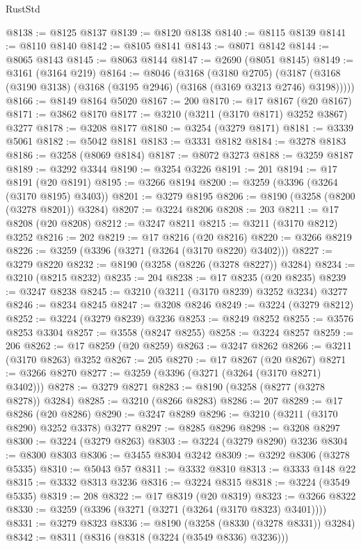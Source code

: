 \begin{lexlean}{RustStd}
\begin{coremodule}
@8138 := @8125 @8137
@8139 := @8120 @8138
@8140 := @8115 @8139
@8141 := @8110 @8140
@8142 := @8105 @8141
@8143 := @8071 @8142
@8144 := @8065 @8143
@8145 := @8063 @8144
@8147 := @2690 (@8051 @8145)
@8149 := @3161 (@3164 @219)
@8164 := @8046
    (@3168
      (@3180 @2705)
      (@3187 (@3168 (@3190 @3138) (@3168 (@3195 @2946) (@3168 (@3169 @3213 @2746) @3198)))))
@8166 := @8149 @8164 @5020
@8167 := 200
@8170 := @17 @8167 (@20 @8167)
@8171 := @3862 @8170
@8177 := @3210 (@3211 (@3170 @8171) @3252 @3867) @3277
@8178 := @3208 @8177
@8180 := @3254 (@3279 @8171)
@8181 := @3339 @5061
@8182 := @5042 @8181
@8183 := @3331 @8182
@8184 := @3278 @8183
@8186 := @3258 (@8069 @8184)
@8187 := @8072 @3273
@8188 := @3259 @8187
@8189 := @3292 @3344
@8190 := @3254 @3226
@8191 := 201
@8194 := @17 @8191 (@20 @8191)
@8195 := @3266 @8194
@8200 := @3259 (@3396 (@3264 (@3170 @8195) @3403))
@8201 := @3279 @8195
@8206 := @8190 (@3258 (@8200 (@3278 @8201)) @3284)
@8207 := @3224 @8206
@8208 := 203
@8211 := @17 @8208 (@20 @8208)
@8212 := @3247 @8211
@8215 := @3211 (@3170 @8212) @3252
@8216 := 202
@8219 := @17 @8216 (@20 @8216)
@8220 := @3266 @8219
@8226 := @3259 (@3396 (@3271 (@3264 (@3170 @8220) @3402)))
@8227 := @3279 @8220
@8232 := @8190 (@3258 (@8226 (@3278 @8227)) @3284)
@8234 := @3210 (@8215 @8232)
@8235 := 204
@8238 := @17 @8235 (@20 @8235)
@8239 := @3247 @8238
@8245 := @3210 (@3211 (@3170 @8239) @3252 @3234) @3277
@8246 := @8234 @8245
@8247 := @3208 @8246
@8249 := @3224 (@3279 @8212)
@8252 := @3224 (@3279 @8239) @3236
@8253 := @8249 @8252
@8255 := @3576 @8253 @3304
@8257 := @3558 (@8247 @8255)
@8258 := @3224 @8257
@8259 := 206
@8262 := @17 @8259 (@20 @8259)
@8263 := @3247 @8262
@8266 := @3211 (@3170 @8263) @3252
@8267 := 205
@8270 := @17 @8267 (@20 @8267)
@8271 := @3266 @8270
@8277 := @3259 (@3396 (@3271 (@3264 (@3170 @8271) @3402)))
@8278 := @3279 @8271
@8283 := @8190 (@3258 (@8277 (@3278 @8278)) @3284)
@8285 := @3210 (@8266 @8283)
@8286 := 207
@8289 := @17 @8286 (@20 @8286)
@8290 := @3247 @8289
@8296 := @3210 (@3211 (@3170 @8290) @3252 @3378) @3277
@8297 := @8285 @8296
@8298 := @3208 @8297
@8300 := @3224 (@3279 @8263)
@8303 := @3224 (@3279 @8290) @3236
@8304 := @8300 @8303
@8306 := @3455 @8304 @3242
@8309 := @3292 @8306 (@3278 @5335)
@8310 := @5043 @57
@8311 := @3332 @8310
@8313 := @3333 @148 @22
@8315 := @3332 @8313 @3236
@8316 := @3224 @8315
@8318 := @3224 (@3549 @5335)
@8319 := 208
@8322 := @17 @8319 (@20 @8319)
@8323 := @3266 @8322
@8330 := @3259 (@3396 (@3271 (@3271 (@3264 (@3170 @8323) @3401))))
@8331 := @3279 @8323
@8336 := @8190 (@3258 (@8330 (@3278 @8331)) @3284)
@8342 := @8311 (@8316 (@8318 (@3224 (@3549 @8336) @3236)))

\end{coremodule}
\end{lexlean}
